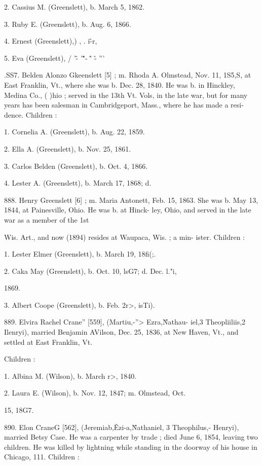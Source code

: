 2. Cassius M. (Greenslett), b. March 5, 1862. 

3. Ruby E. (Greenslett), b. Aug. 6, 1866. 

4. Ernest (Greenslett),) , .  i\^-r, 

5. Eva (Greenslett), / '\^- '\^"- \^' \^- ''' 

.SS7. Belden Alonzo Gkeenslett [5] ; m. Rhoda A. Olmstead, Nov. 
11, 1S5,S, at East Franklin, Vt., where she was b. Dec. 28, 
1840. He was b. in Hinckley, Medina Co., ( )hio ; served in the 
13th Vt. Vols, in the late war, but for many years has been 
salesman in Cambridgeport, Mass., where he has made a resi- 
dence. Children : 

1. Cornelia A. (Greenslett), b. Aug. 22, 1859. 

2. Ella A. (Greenslett), b. Nov. 25, 1861. 

3. Carlos Belden (Greenslett), b. Oct. 4, 1866. 

4. Lester A. (Greenslett), b. March 17, 1868; d. 

888. Henry Greenslett [6] ; m. Maria Antonett, Feb. 15, 1863. She 
was b. May 13, 1844, at Painesville, Ohio. He was b. at Hinck- 
ley, Ohio, and served in the late war as a member of the 1st 




Wis. Art., and now (1894) resides at Waupaca, Wis. ; a min- 
ister. Children : 

1. Lester Elmer (Greenslett), b. March 19, 18fi(;. 

2. Caka May (Greenslett), b. Oct. 10, lsG7; d. Dec. l."i, 

1869. 

3. Albert Coope (Greenslett), b. Feb. 2r>, isTi). 

889. Elvira Rachel Crane'' [559], (Martiu,-''> Ezra,\^ Nathau- 
iel,3 Theopliiliis,2 Ilenryi), married Benjamin AVilson, Dec. 25, 
1836, at New Haven, Vt., and settled at East Franklin, Vt. 

Children : 

1. Albina M. (Wilson), b. March r>, 1840. 

2. Laura E. (Wilson), b. Nov. 12, 1847; m.  Olmstead, Oct. 

15, 18G7. 

890. Elon CraneG [562], (Jeremiab,\^ Ezi-a,\^ Nathaniel, 3 
Theophilus,- Henryi), married Betsy Case. He was a carpenter 
by trade ; died June 6, 1854, leaving two children. He was 
killed by lightning while standing in the doorway of his house in 
Chicago, 111. Children : 

